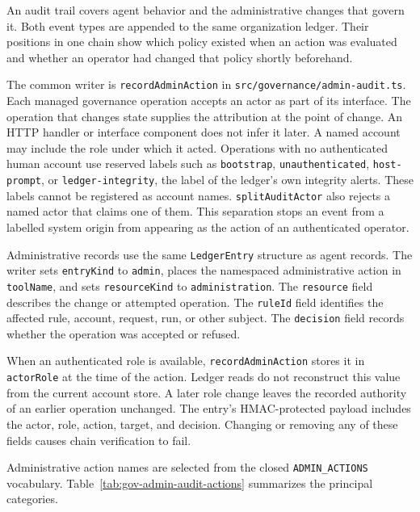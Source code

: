 An audit trail covers agent behavior and the administrative changes that govern it. Both event types are appended to the same organization ledger. Their positions in one chain show which policy existed when an action was evaluated and whether an operator had changed that policy shortly beforehand.

The common writer is \texttt{recordAdminAction} in
\texttt{src/governance/admin-audit.ts}. Each managed governance operation accepts an actor as part of its interface. The operation that changes state supplies the attribution at the point of change. An HTTP handler or interface component does not infer it later. A named account may include the role under which it acted. Operations with no authenticated human account use reserved labels such as
\texttt{bootstrap}, \texttt{unauthenticated}, {\color{red}\texttt{host-prompt},
or \texttt{ledger-integrity}, the label of the ledger's own integrity alerts}. These labels cannot be registered as account names.
\texttt{splitAuditActor} also rejects a named actor that claims one of them. This separation stops an event from a labelled system origin from appearing as the action of an authenticated operator.

Administrative records use the same \texttt{LedgerEntry} structure as agent records. The writer sets \texttt{entryKind} to \texttt{admin}, places the namespaced administrative action in \texttt{toolName}, and sets
\texttt{resourceKind} to \texttt{administration}. The \texttt{resource} field describes the change or attempted operation. The \texttt{ruleId} field identifies the affected rule, account, request, run, or other subject. The
\texttt{decision} field records whether the operation was accepted or refused.

When an authenticated role is available, \texttt{recordAdminAction} stores it in
\texttt{actorRole} at the time of the action. Ledger reads do not reconstruct this value from the current account store. A later role change leaves the recorded authority of an earlier operation unchanged. The entry's HMAC-protected payload includes the actor, role, action, target, and decision. Changing or removing any of these fields causes chain verification to fail.

Administrative action names are selected from the closed
\texttt{ADMIN\_ACTIONS} vocabulary. Table~\ref{tab:gov-admin-audit-actions} summarizes the principal categories.

